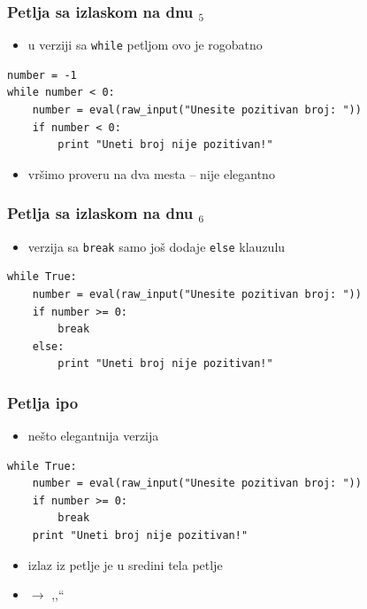 \documentclass[utf8,compress]{beamer}
\begin{document}
\begin{frame}[fragile]
  \frametitle{Petlja sa izlaskom na dnu $_5$}
  \begin{itemize}
    \item u verziji sa \texttt{while} petljom ovo je rogobatno
  \end{itemize}
\begin{verbatim}
number = -1
while number < 0:
    number = eval(raw_input("Unesite pozitivan broj: "))
    if number < 0:
        print "Uneti broj nije pozitivan!"
\end{verbatim}
  \begin{itemize}
    \item vršimo proveru na dva mesta -- nije elegantno
  \end{itemize}
\end{frame}

\begin{frame}[fragile]
  \frametitle{Petlja sa izlaskom na dnu $_6$}
  \begin{itemize}
    \item verzija sa \texttt{break} samo još dodaje \texttt{else} klauzulu
  \end{itemize}
\begin{verbatim}
while True:
    number = eval(raw_input("Unesite pozitivan broj: "))
    if number >= 0:
        break
    else:
        print "Uneti broj nije pozitivan!"
\end{verbatim}
\end{frame}

\begin{frame}[fragile]
  \frametitle{Petlja ipo}
  \begin{itemize}
    \item nešto elegantnija verzija
  \end{itemize}
\begin{verbatim}
while True:
    number = eval(raw_input("Unesite pozitivan broj: "))
    if number >= 0: 
        break
    print "Uneti broj nije pozitivan!"
\end{verbatim}
  \begin{itemize}
    \item izlaz iz petlje je u sredini tela petlje
    \item $\rightarrow$ ,,``
  \end{itemize}
\end{frame}
\end{document}
